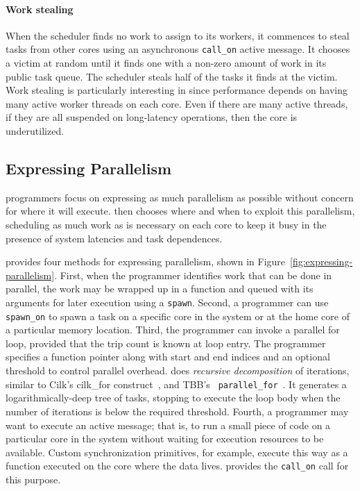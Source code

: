 \paragraph{Work stealing} 
When the scheduler finds no work to assign to its workers, it commences to
steal tasks from other cores using an asynchronous \texttt{call\_on} active
message. It chooses a victim at random until it finds one with a non-zero
amount of work in its public task queue. The scheduler steals half of the
tasks it finds at the victim. Work stealing is particularly interesting in
\Grappa since performance depends on having many active worker threads on each
core. Even if there are many active threads, if they are all suspended on
long-latency operations, then the core is underutilized.

\subsection{Expressing Parallelism}

\Grappa programmers focus on expressing as much parallelism as possible
without concern for where it will execute. \Grappa then chooses where and when
to exploit this parallelism, scheduling as much work as is necessary on each
core to keep it busy in the presence of system latencies and task dependences.

\Grappa provides four methods for expressing parallelism, shown in
Figure~\ref{fig:expressing-parallelism}. First, when the programmer identifies
work that can be done in parallel, the work may be wrapped up in a function
and queued with its arguments for later execution using a \texttt{spawn}.
Second, a programmer can use \texttt{spawn\_on} to spawn a task on a specific
core in the system or at the home core of a particular memory location. Third,
the programmer can invoke a parallel for loop, provided that the trip count is
known at loop entry. The programmer specifies a function pointer along with
start and end indices and an optional threshold to control parallel overhead.
\Grappa does {\em recursive decomposition} of iterations, similar to Cilk's
cilk\_for construct~\cite {cilkforimplementation}, and TBB's {\tt
parallel\_for}~\cite{intel_tbb}. It generates a logarithmically-deep tree of
tasks, stopping to execute the loop body when the number of iterations is
below the required threshold. Fourth, a programmer may want to execute an active message; that is, to run a
small piece of code on a particular core in the system without waiting for
execution resources to be available. Custom synchronization primitives, for example, execute this way as a function executed on the core where the data
lives. \Grappa provides the \texttt{call\_on} call for this purpose.

